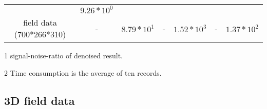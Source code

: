 \begin{table}[!t]
{\begin{threeparttable}[b]
\begin{tabular}{ccccccc}
                                          & $9.26*10^{0}$                       \\
                field data (700*266*310)  & -
                                          & $8.79*10^{1}$
                                          & -
                                          & $1.52*10^{3}$
                                          & -
                                          & $1.37*10^{2}$                       \\
                \bottomrule
            \end{tabular}
            \begin{tablenotes}
                \item[1] {signal-noise-ratio of denoised result.}
                \item[2] {Time consumption is the average of ten records.}
            \end{tablenotes}
        \end{threeparttable}}
\end{table}

\subsection{3D field data}

